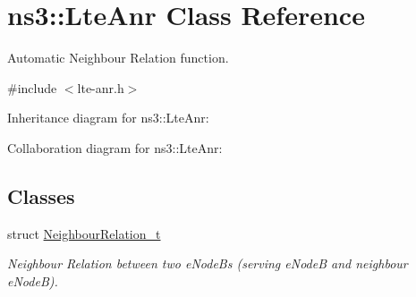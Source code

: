 \hypertarget{classns3_1_1LteAnr}{}\section{ns3\+:\+:Lte\+Anr Class Reference}
\label{classns3_1_1LteAnr}


Automatic Neighbour Relation function.  




{\ttfamily \#include $<$lte-\/anr.\+h$>$}



Inheritance diagram for ns3\+:\+:Lte\+Anr\+:


Collaboration diagram for ns3\+:\+:Lte\+Anr\+:
\subsection*{Classes}
\begin{DoxyCompactItemize}
\item 
struct \hyperlink{structns3_1_1LteAnr_1_1NeighbourRelation__t}{Neighbour\+Relation\+\_\+t}
\begin{DoxyCompactList}\small\item\em Neighbour Relation between two e\+Node\+Bs (serving e\+NodeB and neighbour e\+NodeB). \end{DoxyCompactList}\end{DoxyCompactItemize}
